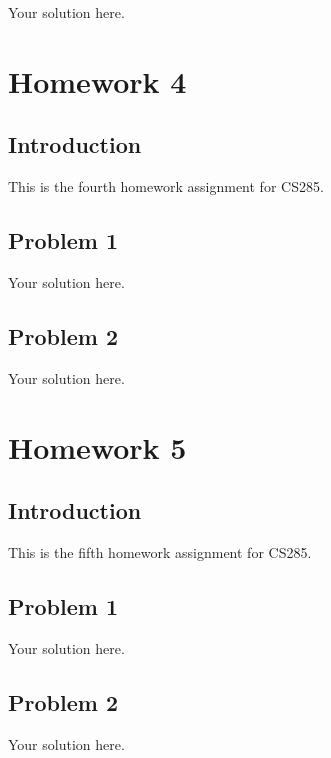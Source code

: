 \documentclass[12pt,oneside]{book}
\begin{document}
Your solution here.

\chapter{Homework 4}

\section{Introduction}

This is the fourth homework assignment for CS285.

\section{Problem 1}

Your solution here.

\section{Problem 2}

Your solution here.

\chapter{Homework 5}

\section{Introduction}

This is the fifth homework assignment for CS285.

\section{Problem 1}

Your solution here.

\section{Problem 2}

Your solution here.
\end{document}
